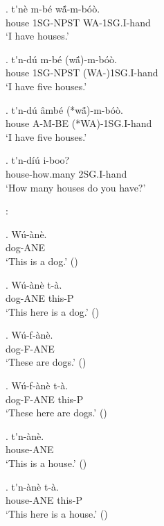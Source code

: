 \documentclass{assets/fieldnotes}
\begin{document}
\exg. t\'{}n\`{e} m-b\'{e} wã́-m-b\'{o}\`{o}. \\
house 1SG-NPST WA-1SG.I-hand \\
`I have houses.'

\exg. t\'{}n-d\'{u} m-b\'{e} (wã́)-m-b\'{o}\`{o}. \\
house 1SG-NPST (WA-)1SG.I-hand \\
`I have five houses.' 

\exg. t\'{}n-d\'{u} \^{a}mb\'{e} (*wã́)-m-b\'{o}\`{o}. \\
house A-M-BE (*WA)-1SG.I-hand \\
`I have five houses.' 


\exg. t\'{}n-d\'{i}\'{u} i-boo? \\
house-how.many 2SG.I-hand \\
`How many houses do you have?'

:

\exg. W\'{u}-\`{a}n\`{e}. \\
dog-ANE \\
`This is a dog.' ()

\exg. W\'{u}-\`{a}n\`{e} t-\`{a}. \\
dog-ANE this-P \\
`This here is a dog.' ()

\exg. W\'{u}-f-\`{a}n\`{e}. \\
dog-F-ANE \\
`These are dogs.' ()

\exg. W\'{u}-f-\`{a}n\`{e} t-\`{a}. \\
dog-F-ANE this-P \\
`These here are dogs.' ()

\exg. t\'{}n-\`{a}n\`{e}. \\
house-ANE \\
`This is a house.' ()

\exg. t\'{}n-\`{a}n\`{e} t-\`{a}. \\
house-ANE this-P\\
`This here is a house.' ()
\end{document}
